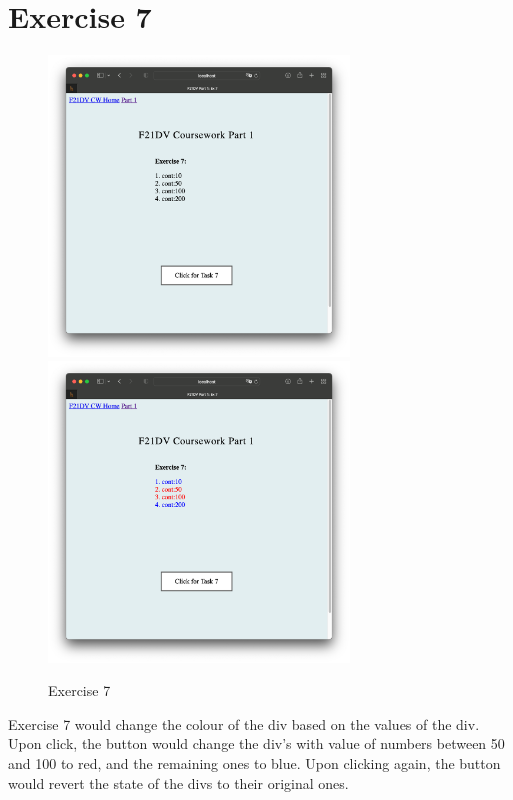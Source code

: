 \documentclass{scrreprt}
\begin{document}
\newpage
\section{Exercise 7}
\begin{figure}[!ht]
    \centering
    \includegraphics[width = 8cm]{images/ex7_1.png}
    \includegraphics[width = 8cm]{images/ex7_2.png}
    \label{fig:ex7}
    \caption{Exercise 7}
\end{figure}
\FloatBarrier
% 
Exercise 7 would change the colour of the div based on the values of the div. Upon click, the button
would change the div's with value of numbers between 50 and 100 to red, and the remaining ones to blue.
Upon clicking again, the button would revert the state of the divs to their original ones. 

\newpage
\end{document}
